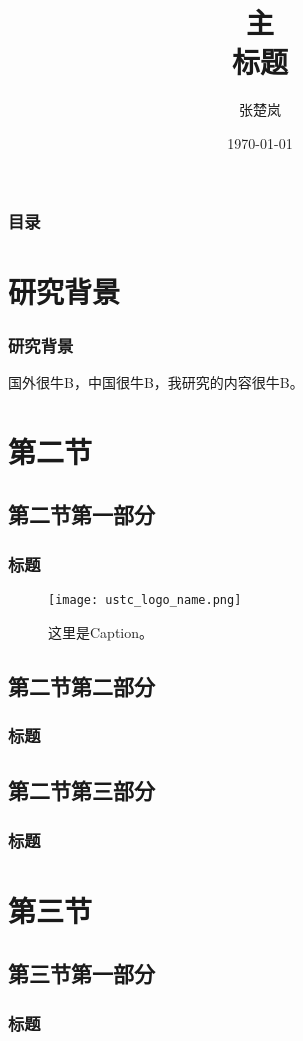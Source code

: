 \documentclass[xetex,mathserif,serif,handout]{beamer}
\begin{document}
\title[页脚中的简写标题]{主\\标题}
\author{张楚岚}
\date{\today}

\frame{\titlepage}

\begin{frame}
	\frametitle{目录}
	\makecontents
\end{frame}

\section{研究背景}
\begin{frame}
	\frametitle{研究背景}
	国外很牛B，中国很牛B，我研究的内容很牛B。\cite{wootters1982single}
\end{frame}

\section{第二节}
\subsection{第二节第一部分}
\begin{frame}
	\frametitle{标题}
	\begin{figure}
		\centering
		\texttt{[image: ustc\_logo\_name.png]}
		\caption{这里是Caption。}
	\end{figure}
\end{frame}
\subsection{第二节第二部分}
\begin{frame}
	\frametitle{标题}
\end{frame}
\subsection{第二节第三部分}
\begin{frame}
	\frametitle{标题}
\end{frame}


\section{第三节}
\subsection{第三节第一部分}
\begin{frame}
	\frametitle{标题}
\end{frame}
\end{document}
